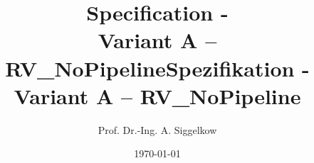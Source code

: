 \documentclass[a4paper,12pt]{book}
\newcommand{\TEXTa}{./}
\newcommand{\asvariant}{Variant A -- RV\_NoPipeline}
\begin{document}
{\title{Specification - \aschip \\ \asvariant}}
{\title{Spezifikation - \aschip \\ \asvariant}}
\author{Prof. Dr.-Ing. A. Siggelkow}
\date{\today}
\begin{titlepage}
  \maketitle
  \thispagestyle{empty}
\end{titlepage}
\thispagestyle{empty}
\newpage
\setcounter{chapter}{0}
%

\printbibliography
\end{document}
